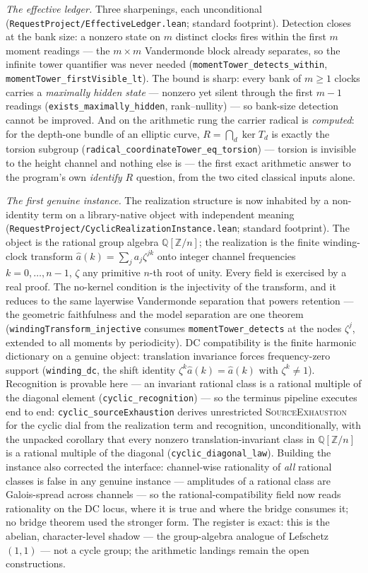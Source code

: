 \documentclass[11pt]{article}
\theoremstyle{definition}
\theoremstyle{remark}
\begin{document}
\emph{The effective ledger.} Three sharpenings, each unconditional
(\texttt{RequestProject/EffectiveLedger.lean}; standard footprint). Detection
closes at the bank size: a nonzero state on $m$ distinct clocks fires within
the first $m$ moment readings --- the $m\times m$ Vandermonde block already
separates, so the infinite tower quantifier was never needed
(\texttt{momentTower\_detects\_within},
\texttt{momentTower\_firstVisible\_lt}). The bound is sharp: every bank of
$m\ge1$ clocks carries a \emph{maximally hidden state} --- nonzero yet silent
through the first $m-1$ readings (\texttt{exists\_maximally\_hidden},
rank--nullity) --- so bank-size detection cannot be improved. And on the
arithmetic rung the carrier radical is \emph{computed}: for the depth-one
bundle of an elliptic curve, $R=\bigcap_d\ker T_d$ is exactly the torsion
subgroup (\texttt{radical\_coordinateTower\_eq\_torsion}) --- torsion is
invisible to the height channel and nothing else is --- the first exact
arithmetic answer to the program's own \emph{identify $R$} question, from the
two cited classical inputs alone.

\emph{The first genuine instance.} The realization structure is now inhabited
by a non-identity term on a library-native object with independent meaning
(\texttt{RequestProject/CyclicRealizationInstance.lean}; standard footprint).
The object is the rational group algebra $\mathbb Q[\mathbb Z/n]$; the
realization is the finite winding-clock transform
$\widehat a(k)=\sum_j a_j\zeta^{jk}$ onto integer channel frequencies
$k=0,\dots,n-1$, $\zeta$ any primitive $n$-th root of unity. Every field is
exercised by a real proof. The no-kernel condition is the injectivity of the
transform, and it reduces to the same layerwise Vandermonde separation that
powers retention --- the geometric faithfulness and the model separation are
one theorem (\texttt{windingTransform\_injective} consumes
\texttt{momentTower\_detects} at the nodes $\zeta^j$, extended to all moments
by periodicity). DC compatibility is the finite harmonic dictionary on a
genuine object: translation invariance forces frequency-zero support
(\texttt{winding\_dc}, the shift identity
$\zeta^k\widehat a(k)=\widehat a(k)$ with $\zeta^k\neq1$). Recognition is
provable here --- an invariant rational class is a rational multiple of the
diagonal element (\texttt{cyclic\_recognition}) --- so the terminus pipeline
executes end to end: \texttt{cyclic\_sourceExhaustion} derives unrestricted
\textsc{SourceExhaustion} for the cyclic dial from the realization term and
recognition, unconditionally, with the unpacked corollary that every nonzero
translation-invariant class in $\mathbb Q[\mathbb Z/n]$ is a rational multiple
of the diagonal (\texttt{cyclic\_diagonal\_law}). Building the instance also
corrected the interface: channel-wise rationality of \emph{all} rational
classes is false in any genuine instance --- amplitudes of a rational class
are Galois-spread across channels --- so the rational-compatibility field now
reads rationality on the DC locus, where it is true and where the bridge
consumes it; no bridge theorem used the stronger form. The register is exact:
this is the abelian, character-level shadow --- the group-algebra analogue of
Lefschetz~$(1,1)$ --- not a cycle group; the arithmetic landings remain the
open constructions.
\end{document}
